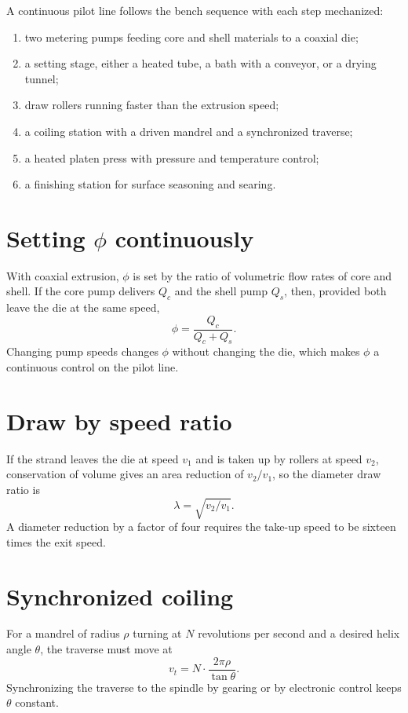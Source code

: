 \documentclass[11pt,openany]{book}
\theoremstyle{definition}
\begin{document}
A continuous pilot line follows the bench sequence with each step mechanized:

\begin{enumerate}
\item two metering pumps feeding core and shell materials to a coaxial die;
\item a setting stage, either a heated tube, a bath with a conveyor, or a drying tunnel;
\item draw rollers running faster than the extrusion speed;
\item a coiling station with a driven mandrel and a synchronized traverse;
\item a heated platen press with pressure and temperature control;
\item a finishing station for surface seasoning and searing.
\end{enumerate}

\section{Setting \texorpdfstring{$\phi$}{phi} continuously}

With coaxial extrusion, $\phi$ is set by the ratio of volumetric flow rates of core and shell. If the core pump delivers $Q_c$ and the shell pump $Q_s$, then, provided both leave the die at the same speed,
\[
\phi = \frac{Q_c}{Q_c + Q_s}.
\]
Changing pump speeds changes $\phi$ without changing the die, which makes $\phi$ a continuous control on the pilot line.

\section{Draw by speed ratio}

If the strand leaves the die at speed $v_1$ and is taken up by rollers at speed $v_2$, conservation of volume gives an area reduction of $v_2/v_1$, so the diameter draw ratio is
\[
\lambda = \sqrt{v_2/v_1}.
\]
A diameter reduction by a factor of four requires the take-up speed to be sixteen times the exit speed.

\section{Synchronized coiling}

For a mandrel of radius $\rho$ turning at $N$ revolutions per second and a desired helix angle $\theta$, the traverse must move at
\[
v_t = N \cdot \frac{2\pi\rho}{\tan\theta}.
\]
Synchronizing the traverse to the spindle by gearing or by electronic control keeps $\theta$ constant.
\end{document}
